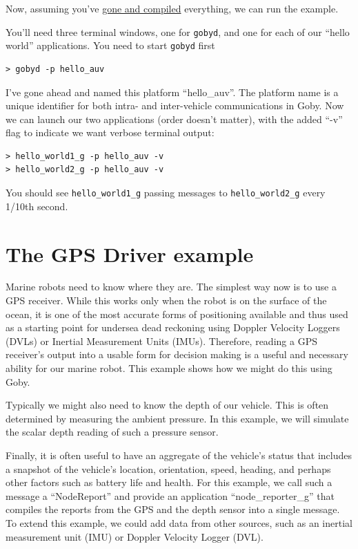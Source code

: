 \documentclass[11pt, letterpaper]{article}
\begin{document}
Now, assuming you've \href{http://gobysoft.com/doc}{gone and compiled} everything, we can run the example.

You'll need three terminal windows, one for \texttt{gobyd}, and one for each of our ``hello world'' applications. You need to start \texttt{gobyd} first
\begin{verbatim}
> gobyd -p hello_auv
\end{verbatim}
I've gone ahead and named this platform ``hello\_auv''. The platform name is a unique identifier for both intra- and inter-vehicle communications in Goby. Now we can launch our two applications (order doesn't matter), with the added ``-v'' flag to indicate we want verbose terminal output:

\begin{verbatim}
> hello_world1_g -p hello_auv -v
> hello_world2_g -p hello_auv -v
\end{verbatim}

You should see \texttt{hello\_world1\_g} passing messages to \texttt{hello\_world2\_g} every 1/10th second.

\section{The GPS Driver example}

Marine robots need to know where they are. The simplest way now is to use a GPS receiver. While this works only when the robot is on the surface of the ocean, it is one of the most accurate forms of positioning available and thus used as a starting point for undersea dead reckoning using Doppler Velocity Loggers (DVLs) or Inertial Measurement Units (IMUs). Therefore, reading a GPS receiver's output into a usable form for decision making is a useful and necessary ability for our marine robot. This example shows how we might do this using Goby.

Typically we might also need to know the depth of our vehicle. This is often determined by measuring the ambient pressure. In this example, we will simulate the scalar depth reading of such a pressure sensor.

Finally, it is often useful to have an aggregate of the vehicle's status that includes a snapshot of the vehicle's location, orientation, speed, heading, and perhaps other factors such as battery life and health. For this example, we call such a message a ``NodeReport'' and provide an application ``node\_reporter\_g'' that compiles the reports from the GPS and the depth sensor into a single message. To extend this example, we could add data from other sources, such as an inertial measurement unit (IMU) or Doppler Velocity Logger (DVL).
\end{document}
